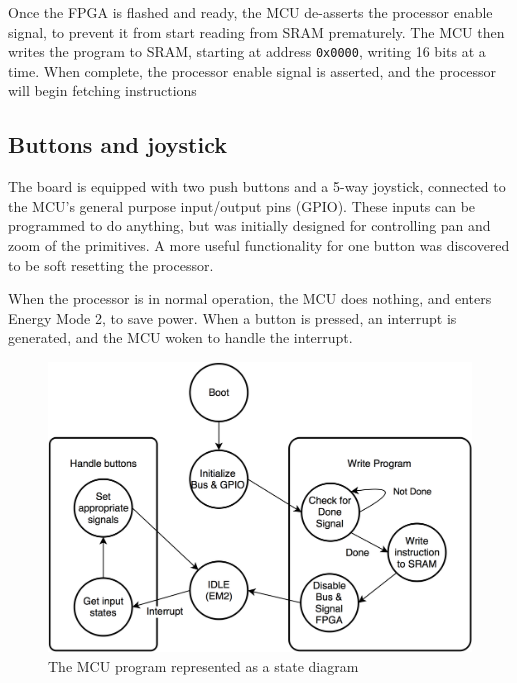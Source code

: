 Once the FPGA is flashed and ready, the MCU de-asserts the processor enable signal, to prevent it from start reading from SRAM prematurely.
The MCU then writes the program to SRAM, starting at address \texttt{0x0000}, writing 16 bits at a time.
When complete, the processor enable signal is asserted, and the processor will begin fetching instructions

\subsection{Buttons and joystick}
The board is equipped with two push buttons and a 5-way joystick, connected to the MCU's general purpose input/output pins (GPIO).
These inputs can be programmed to do anything, but was initially designed for controlling pan and zoom of the primitives.
A more useful functionality for one button was discovered to be soft resetting the processor.

When the processor is in normal operation, the MCU does nothing, and enters Energy Mode 2, to save power.
When a button is pressed, an interrupt is generated, and the MCU woken to handle the interrupt.

\begin{figure}[h!]
\centering \includegraphics[width = 0.75\linewidth]{images/MCU_state.png}
\caption{The MCU program represented as a state diagram}
\label{fig:mcu_state}
\end{figure}